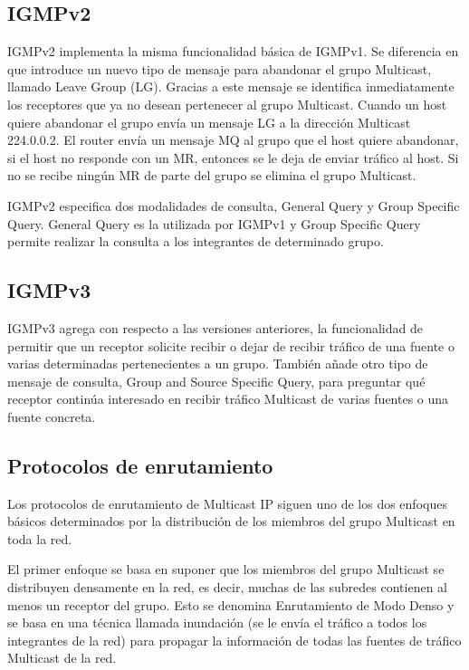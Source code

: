 \documentclass[12pt,a4paper,oneside]{book}
\begin{document}
\subsection{IGMPv2}
\label{igmpv2}

IGMPv2 implementa la misma funcionalidad básica de IGMPv1. Se diferencia en que introduce un nuevo tipo de mensaje para abandonar el grupo Multicast, llamado Leave Group (LG). Gracias a este mensaje se identifica inmediatamente los receptores que ya no desean pertenecer al grupo Multicast. Cuando un host quiere abandonar el grupo envía un mensaje LG a la dirección Multicast 224.0.0.2. El router envía un mensaje MQ al grupo que el host quiere abandonar, si el host no responde con un MR, entonces se le deja de enviar tráfico al host. Si no se recibe ningún MR de parte del grupo se elimina el grupo Multicast.

\vspace{0.5cm}

IGMPv2 especifica dos modalidades de consulta, General Query y Group Specific Query. General Query es la utilizada por IGMPv1 y Group Specific Query permite realizar la consulta a los integrantes de determinado grupo.


\subsection{IGMPv3}
\label{igmpv3}

IGMPv3 agrega con respecto a las versiones anteriores, la funcionalidad de permitir que un receptor solicite recibir o dejar de recibir tráfico de una fuente o varias determinadas pertenecientes a un grupo. También añade otro tipo de mensaje de consulta, Group and Source Specific Query, para preguntar qué receptor continúa interesado en recibir tráfico Multicast de varias fuentes o una fuente concreta.

\subsection{Protocolos de enrutamiento}

Los protocolos de enrutamiento de Multicast IP siguen uno de los dos enfoques básicos determinados por la distribución de los miembros del grupo Multicast en toda la red.

\vspace{0.5cm}

El primer enfoque se basa en suponer que los miembros del grupo Multicast se distribuyen densamente en la red, es decir, muchas de las subredes contienen al menos un receptor del grupo. Esto se denomina Enrutamiento de Modo Denso y se basa en una técnica llamada inundación (se le envía el tráfico a todos los integrantes de la red) para propagar la información de todas las fuentes de tráfico Multicast de la red.
\end{document}
